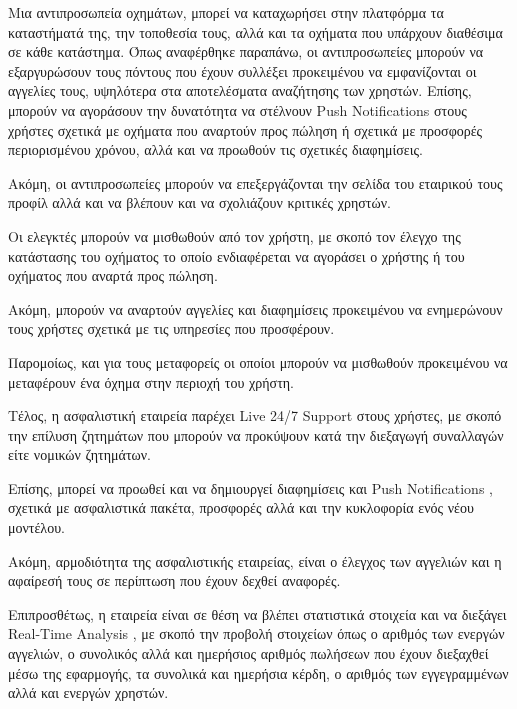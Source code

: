 \documentclass{../ol-softwaremanual}
\begin{document}
	\vspace{5pt}
	
	Μια αντιπροσωπεία οχημάτων, μπορεί να καταχωρήσει στην πλατφόρμα τα καταστήματά της, την τοποθεσία τους, αλλά και τα οχήματα που υπάρχουν διαθέσιμα σε κάθε κατάστημα. \break 
	Όπως αναφέρθηκε παραπάνω, οι αντιπροσωπείες μπορούν να εξαργυρώσουν τους πόντους που έχουν συλλέξει προκειμένου να εμφανίζονται οι αγγελίες τους, υψηλότερα στα αποτελέσματα αναζήτησης των χρηστών. Επίσης, μπορούν να αγοράσουν την δυνατότητα να στέλνουν \en Push Notifications \gr στους χρήστες σχετικά με οχήματα που αναρτούν προς πώληση ή σχετικά με προσφορές περιορισμένου χρόνου, αλλά και να προωθούν τις σχετικές διαφημίσεις. \break
	
	Ακόμη, οι αντιπροσωπείες μπορούν να επεξεργάζονται την σελίδα του εταιρικού τους προφίλ αλλά και να βλέπουν και να σχολιάζουν κριτικές χρηστών.	 \break 
	
	\vspace{5pt}	
	
	Οι ελεγκτές μπορούν να μισθωθούν από τον χρήστη, με σκοπό τον έλεγχο της κατάστασης του οχήματος το οποίο ενδιαφέρεται να αγοράσει ο χρήστης ή του οχήματος που αναρτά προς πώληση. \break
	
	Ακόμη, μπορούν να αναρτούν αγγελίες και διαφημίσεις προκειμένου να ενημερώνουν τους χρήστες σχετικά με τις υπηρεσίες που προσφέρουν.
	
	Παρομοίως, και για τους μεταφορείς οι οποίοι μπορούν να μισθωθούν προκειμένου να μεταφέρουν ένα όχημα στην περιοχή του χρήστη. \break
	
	
	Tέλος, η ασφαλιστική εταιρεία παρέχει \en Live 24/7 Support \gr στους χρήστες, με σκοπό την επίλυση ζητημάτων που μπορούν να προκύψουν κατά την διεξαγωγή συναλλαγών είτε νομικών ζητημάτων. \break
	
	Επίσης, μπορεί να προωθεί και να δημιουργεί διαφημίσεις και \en Push Notifications \gr, σχετικά με ασφαλιστικά πακέτα, προσφορές αλλά και την κυκλοφορία ενός νέου μοντέλου. \break
	
	Ακόμη, αρμοδιότητα της ασφαλιστικής εταιρείας, είναι ο έλεγχος των αγγελιών και η αφαίρεσή τους σε περίπτωση που έχουν δεχθεί αναφορές. \break 
	
	Επιπροσθέτως, η εταιρεία είναι σε θέση να βλέπει στατιστικά στοιχεία και να διεξάγει \en Real-Time Analysis \gr, με σκοπό την προβολή στοιχείων όπως ο αριθμός των ενεργών αγγελιών, ο συνολικός αλλά και ημερήσιος αριθμός πωλήσεων που έχουν διεξαχθεί μέσω της εφαρμογής, τα συνολικά και ημερήσια κέρδη, ο αριθμός των εγγεγραμμένων αλλά και ενεργών χρηστών. \break 
	
\end{document}
